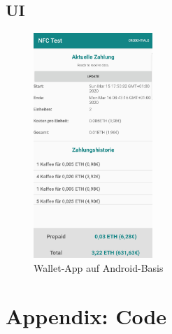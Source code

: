 \newpage

\section{UI}
\label{sec:appendix:implementation:ui}
\begin{figure}[h]
 \centering
 \includegraphics[width=0.4\textwidth]{gfx/screenshots/smartphone.jpg}
 \caption{Wallet-App auf Android-Basis}
 \label{fig:appendix:ui:smartphone}
\end{figure}
\newpage

\chapter{Appendix: Code}
\label{ch:appendix:code}




